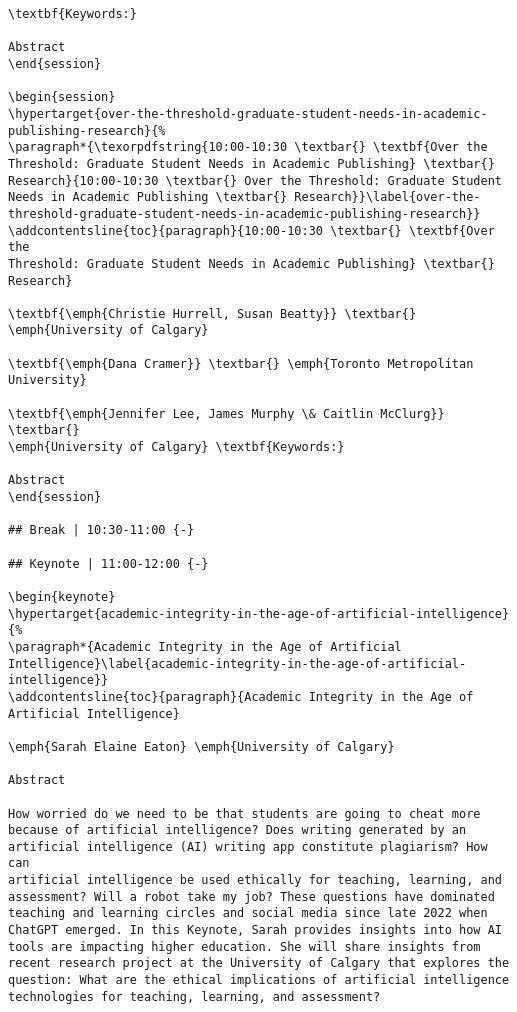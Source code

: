 \documentclass[
]{book}
\begin{document}
\begin{verbatim}
\textbf{Keywords:}

Abstract
\end{session}

\begin{session}
\hypertarget{over-the-threshold-graduate-student-needs-in-academic-publishing-research}{%
\paragraph*{\texorpdfstring{10:00-10:30 \textbar{} \textbf{Over the
Threshold: Graduate Student Needs in Academic Publishing} \textbar{}
Research}{10:00-10:30 \textbar{} Over the Threshold: Graduate Student Needs in Academic Publishing \textbar{} Research}}\label{over-the-threshold-graduate-student-needs-in-academic-publishing-research}}
\addcontentsline{toc}{paragraph}{10:00-10:30 \textbar{} \textbf{Over the
Threshold: Graduate Student Needs in Academic Publishing} \textbar{}
Research}

\textbf{\emph{Christie Hurrell, Susan Beatty}} \textbar{}
\emph{University of Calgary}

\textbf{\emph{Dana Cramer}} \textbar{} \emph{Toronto Metropolitan
University}

\textbf{\emph{Jennifer Lee, James Murphy \& Caitlin McClurg}} \textbar{}
\emph{University of Calgary} \textbf{Keywords:}

Abstract
\end{session}

## Break | 10:30-11:00 {-}

## Keynote | 11:00-12:00 {-}

\begin{keynote}
\hypertarget{academic-integrity-in-the-age-of-artificial-intelligence}{%
\paragraph*{Academic Integrity in the Age of Artificial
Intelligence}\label{academic-integrity-in-the-age-of-artificial-intelligence}}
\addcontentsline{toc}{paragraph}{Academic Integrity in the Age of
Artificial Intelligence}

\emph{Sarah Elaine Eaton} \emph{University of Calgary}

Abstract

How worried do we need to be that students are going to cheat more
because of artificial intelligence? Does writing generated by an
artificial intelligence (AI) writing app constitute plagiarism? How can
artificial intelligence be used ethically for teaching, learning, and
assessment? Will a robot take my job? These questions have dominated
teaching and learning circles and social media since late 2022 when
ChatGPT emerged. In this Keynote, Sarah provides insights into how AI
tools are impacting higher education. She will share insights from
recent research project at the University of Calgary that explores the
question: What are the ethical implications of artificial intelligence
technologies for teaching, learning, and assessment?


\end{verbatim}
\end{document}
